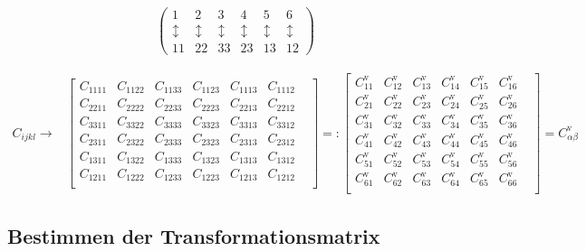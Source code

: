 \documentclass[a4paper]{scrartcl}
\begin{document}
\begin{align}
\begin{pmatrix}
1&2&3&4&5&6\\
\updownarrow&\updownarrow&\updownarrow&\updownarrow&\updownarrow&\updownarrow\\
11&22&33&23&13&12
\end{pmatrix}
\end{align}


 \begin{align} C_{ijkl} \longrightarrow& \begin{bmatrix} C_{1111} & C_{1122} &
C_{1133} & C_{1123} & C_{1113} & C_{1112} & \\ C_{2211} & C_{2222} & C_{2233} &
C_{2223} & C_{2213} & C_{2212} & \\ C_{3311} & C_{3322} & C_{3333} & C_{3323} &
C_{3313} &  C_{3312} & \\ C_{2311} & C_{2322} & C_{2333} & C_{2323} & C_{2313} &
C_{2312}  & \\ C_{1311} & C_{1322} & C_{1333} & C_{1323} & C_{1313} & C_{1312} &
\\  C_{1211} & C_{1222} & C_{1233} & C_{1223} & C_{1213} & C_{1212} & \\ 
\end{bmatrix}=: \begin{bmatrix} C_{11}^{\text{v}} & C_{12}^{\text{v}} &
C_{13}^{\text{v}} &  C_{14}^{\text{v}} & C_{15}^{\text{v}} & C_{16}^{\text{v}} &
\\  C_{21}^{\text{v}} & C_{22}^{\text{v}} & C_{23}^{\text{v}} &
C_{24}^{\text{v}} & C_{25}^{\text{v}} &  C_{26}^{\text{v}} & \\
C_{31}^{\text{v}} & C_{32}^{\text{v}} &  C_{33}^{\text{v}} & C_{34}^{\text{v}} &
C_{35}^{\text{v}} &  C_{36}^{\text{v}} & \\ C_{41}^{\text{v}} &
C_{42}^{\text{v}} & C_{43}^{\text{v}}  & C_{44}^{\text{v}} & C_{45}^{\text{v}} &
C_{46}^{\text{v}} &  \\ C_{51}^{\text{v}} & C_{52}^{\text{v}} &
C_{53}^{\text{v}} & C_{54}^{\text{v}}  & C_{55}^{\text{v}} & C_{56}^{\text{v}} &
\\ C_{61}^{\text{v}}  & C_{62}^{\text{v}} & C_{63}^{\text{v}} &
C_{64}^{\text{v}} & C_{65}^{\text{v}}  & C_{66}^{\text{v}} & \\ \end{bmatrix} =C^{\text{v}}_{\alpha\beta} \end{align}

\subsection{Bestimmen der Transformationsmatrix}
\end{document}
